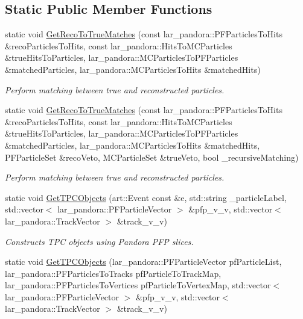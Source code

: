 \subsection*{\-Static \-Public \-Member \-Functions}
\begin{DoxyCompactItemize}
\item 
static void \hyperlink{classUBXSecHelper_a0708dbe6fb5f3ea0f200362887473e36}{\-Get\-Reco\-To\-True\-Matches} (const lar\-\_\-pandora\-::\-P\-F\-Particles\-To\-Hits \&reco\-Particles\-To\-Hits, const lar\-\_\-pandora\-::\-Hits\-To\-M\-C\-Particles \&true\-Hits\-To\-Particles, lar\-\_\-pandora\-::\-M\-C\-Particles\-To\-P\-F\-Particles \&matched\-Particles, lar\-\_\-pandora\-::\-M\-C\-Particles\-To\-Hits \&matched\-Hits)
\begin{DoxyCompactList}\small\item\em \-Perform matching between true and reconstructed particles. \end{DoxyCompactList}\item 
static void \hyperlink{classUBXSecHelper_a111c32be3cab634ffacbfa03e7ea789b}{\-Get\-Reco\-To\-True\-Matches} (const lar\-\_\-pandora\-::\-P\-F\-Particles\-To\-Hits \&reco\-Particles\-To\-Hits, const lar\-\_\-pandora\-::\-Hits\-To\-M\-C\-Particles \&true\-Hits\-To\-Particles, lar\-\_\-pandora\-::\-M\-C\-Particles\-To\-P\-F\-Particles \&matched\-Particles, lar\-\_\-pandora\-::\-M\-C\-Particles\-To\-Hits \&matched\-Hits, \-P\-F\-Particle\-Set \&reco\-Veto, \-M\-C\-Particle\-Set \&true\-Veto, bool \-\_\-recursive\-Matching)
\begin{DoxyCompactList}\small\item\em \-Perform matching between true and reconstructed particles. \end{DoxyCompactList}\item 
static void \hyperlink{classUBXSecHelper_a36ef4a258300c98061cd01782157433b}{\-Get\-T\-P\-C\-Objects} (art\-::\-Event const \&e, std\-::string \-\_\-particle\-Label, std\-::vector$<$ lar\-\_\-pandora\-::\-P\-F\-Particle\-Vector $>$ \&pfp\-\_\-v\-\_\-v, std\-::vector$<$ lar\-\_\-pandora\-::\-Track\-Vector $>$ \&track\-\_\-v\-\_\-v)
\begin{DoxyCompactList}\small\item\em \-Constructs \-T\-P\-C objects using \-Pandora \-P\-F\-P slices. \end{DoxyCompactList}\item 
static void \hyperlink{classUBXSecHelper_a900fbd13023a46b8d3c0a38aae84a10b}{\-Get\-T\-P\-C\-Objects} (lar\-\_\-pandora\-::\-P\-F\-Particle\-Vector pf\-Particle\-List, lar\-\_\-pandora\-::\-P\-F\-Particles\-To\-Tracks pf\-Particle\-To\-Track\-Map, lar\-\_\-pandora\-::\-P\-F\-Particles\-To\-Vertices pf\-Particle\-To\-Vertex\-Map, std\-::vector$<$ lar\-\_\-pandora\-::\-P\-F\-Particle\-Vector $>$ \&pfp\-\_\-v\-\_\-v, std\-::vector$<$ lar\-\_\-pandora\-::\-Track\-Vector $>$ \&track\-\_\-v\-\_\-v)

\end{DoxyCompactItemize}
